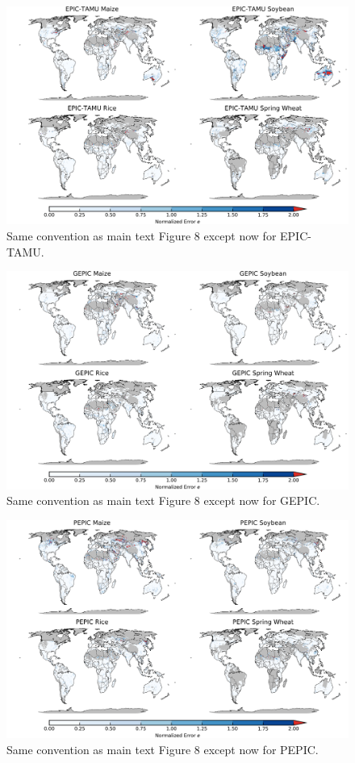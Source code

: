 \documentclass[10pt]{article}
\begin{document}
\begin{figure}[h!]
\centering
\includegraphics[width=15.5cm]{EPIC-TAMU_spatial_error.png}
\caption{Same convention as main text Figure 8 except now for EPIC-TAMU.}
\label{fig:lpjmlnorm}
\end{figure}

\begin{figure}[h!]
\centering
\includegraphics[width=15.5cm]{GEPIC_spatial_error.png}
\caption{Same convention as main text Figure 8 except now for GEPIC.}
\label{fig:lpjmlnorm}
\end{figure}

\begin{figure}[h!]
\centering
\includegraphics[width=15.5cm]{PEPIC_spatial_error.png}
\caption{Same convention as main text Figure 8 except now for PEPIC.}
\label{fig:lpjmlnorm}
\end{figure}
\end{document}
